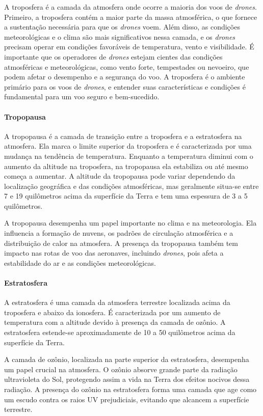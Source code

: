 \documentclass[a4paper, 12pt, onecolumn,singlespacing]{article}
\begin{document}
	A troposfera é a camada da atmosfera onde ocorre a maioria dos voos de \textit{drones}. Primeiro, a troposfera contém a maior parte da massa atmosférica, o que fornece a sustentação necessária para que os \textit{drones} voem. Além disso, as condições meteorológicas e o clima são mais significativos nessa camada, e os \textit{drones} precisam operar em condições favoráveis de temperatura, vento e visibilidade. É importante que os operadores de \textit{drones} estejam cientes das condições atmosféricas e meteorológicas, como vento forte, tempestades ou nevoeiro, que podem afetar o desempenho e a segurança do voo. A troposfera é o ambiente primário para os voos de \textit{drones}, e entender suas características e condições é fundamental para um voo seguro e bem-sucedido.
	
	\paragraph{Tropopausa} A tropopausa é a camada de transição entre a troposfera e a estratosfera na atmosfera. Ela marca o limite superior da troposfera e é caracterizada por uma mudança na tendência de temperatura. Enquanto a temperatura diminui com o aumento da altitude na troposfera, na tropopausa ela estabiliza ou até mesmo começa a aumentar. A altitude da tropopausa pode variar dependendo da localização geográfica e das condições atmosféricas, mas geralmente situa-se entre 7 e 19 quilômetros acima da superfície da Terra e tem uma espessura de 3 a 5 quilômetros.
	
	A tropopausa desempenha um papel importante no clima e na meteorologia. Ela influencia a formação de nuvens, os padrões de circulação atmosférica e a distribuição de calor na atmosfera. A presença da tropopausa também tem impacto nas rotas de voo das aeronaves, incluindo \textit{drones}, pois afeta a estabilidade do ar e as condições meteorológicas.
	
	\paragraph{Estratosfera} A estratosfera é uma camada da atmosfera terrestre localizada acima da troposfera e abaixo da ionosfera. É caracterizada por um aumento de temperatura com a altitude devido à presença da camada de ozônio. A estratosfera estende-se aproximadamente de 10 a 50 quilômetros acima da superfície da Terra.
	
	A camada de ozônio, localizada na parte superior da estratosfera, desempenha um papel crucial na atmosfera. O ozônio absorve grande parte da radiação ultravioleta do Sol, protegendo assim a vida na Terra dos efeitos nocivos dessa radiação. A presença do ozônio na estratosfera forma uma camada que age como um escudo contra os raios UV prejudiciais, evitando que alcancem a superfície terrestre.
	
\end{document}
